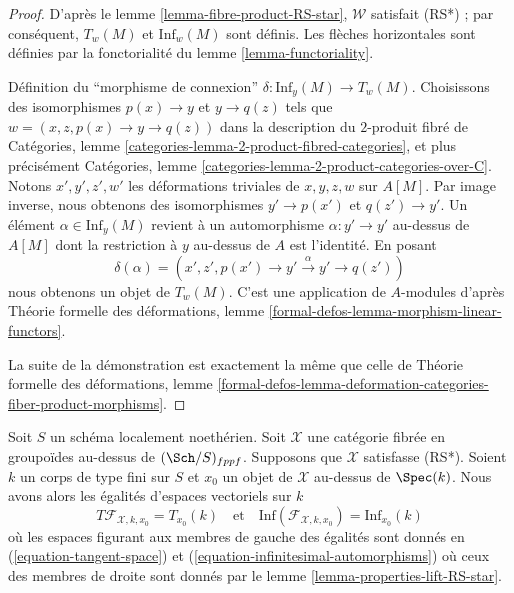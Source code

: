 \begin{proof}
D'après le lemme \ref{lemma-fibre-product-RS-star}, $\mathcal{W}$
satisfait (RS*) ; par conséquent, $T_w(M)$ et $\text{Inf}_w(M)$ sont définis.
Les flèches horizontales sont définies par la fonctorialité du
lemme \ref{lemma-functoriality}.

\medskip\noindent
Définition du ``morphisme de connexion'' $\delta : \text{Inf}_y(M) \to T_w(M)$.
Choisissons des isomorphismes $p(x) \to y$ et $y \to q(z)$ tels que
$w = (x, z, p(x) \to y \to q(z))$ dans la description du
$2$-produit fibré de
Catégories, lemme \ref{categories-lemma-2-product-fibred-categories},
et plus précisément
Catégories, lemme \ref{categories-lemma-2-product-categories-over-C}.
Notons $x', y', z', w'$ les déformations triviales de
$x, y, z, w$ sur $A[M]$. Par image inverse, nous obtenons des isomorphismes
$y' \to p(x')$ et $q(z') \to y'$. Un élément $\alpha \in \text{Inf}_y(M)$
revient à un automorphisme $\alpha : y' \to y'$
au-dessus de $A[M]$ dont la restriction à $y$ au-dessus de $A$ est l'identité.
En posant
$$
\delta(\alpha) =
(x', z', p(x') \to y' \xrightarrow{\alpha} y' \to q(z'))
$$
nous obtenons un objet de $T_w(M)$. C'est une application de $A$-modules
d'après Théorie formelle des déformations, lemme
\ref{formal-defos-lemma-morphism-linear-functors}.

\medskip\noindent
La suite de la démonstration est exactement la même que celle de
Théorie formelle des déformations, lemme
\ref{formal-defos-lemma-deformation-categories-fiber-product-morphisms}.
\end{proof}

\begin{remark}
\label{remark-compare-deformation-spaces}
Soit $S$ un schéma localement noethérien. Soit $\mathcal{X}$ une catégorie fibrée
en groupoïdes au-dessus de $(\Sch/S)_{fppf}$. Supposons que $\mathcal{X}$ satisfasse (RS*).
Soient $k$ un corps de type fini sur $S$ et $x_0$ un objet de
$\mathcal{X}$ au-dessus de $\Spec(k)$. Nous avons alors les égalités d'espaces
vectoriels sur $k$
$$
T\mathcal{F}_{\mathcal{X}, k, x_0} = T_{x_0}(k)
\quad\text{et}\quad
\text{Inf}(\mathcal{F}_{\mathcal{X}, k, x_0}) =
\text{Inf}_{x_0}(k)
$$
où les espaces figurant aux membres de gauche des égalités sont
donnés en (\ref{equation-tangent-space}) et
(\ref{equation-infinitesimal-automorphisms})
où ceux des membres de droite sont donnés par le
lemme \ref{lemma-properties-lift-RS-star}.
\end{remark}


